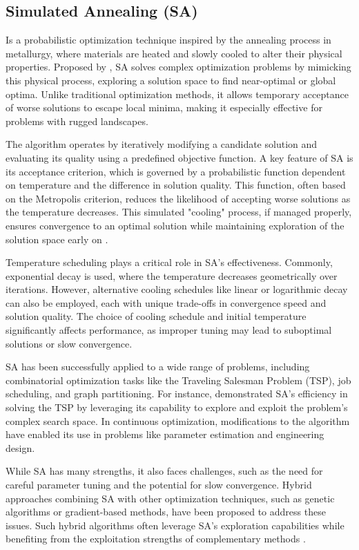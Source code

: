\subsection{Simulated Annealing (SA)}
Is a probabilistic optimization technique inspired by the annealing process in metallurgy, where materials are heated and slowly cooled to alter their physical properties. Proposed by \textcite{kirkpatrick1983optimization}, SA solves complex optimization problems by mimicking this physical process, exploring a solution space to find near-optimal or global optima. Unlike traditional optimization methods, it allows temporary acceptance of worse solutions to escape local minima, making it especially effective for problems with rugged landscapes.

The algorithm operates by iteratively modifying a candidate solution and evaluating its quality using a predefined objective function. A key feature of SA is its acceptance criterion, which is governed by a probabilistic function dependent on temperature and the difference in solution quality. This function, often based on the Metropolis criterion, reduces the likelihood of accepting worse solutions as the temperature decreases. This simulated "cooling" process, if managed properly, ensures convergence to an optimal solution while maintaining exploration of the solution space early on \parencite{aarts1989simulated}.

Temperature scheduling plays a critical role in SA's effectiveness. Commonly, exponential decay is used, where the temperature decreases geometrically over iterations. However, alternative cooling schedules like linear or logarithmic decay can also be employed, each with unique trade-offs in convergence speed and solution quality. The choice of cooling schedule and initial temperature significantly affects performance, as improper tuning may lead to suboptimal solutions or slow convergence.

SA has been successfully applied to a wide range of problems, including combinatorial optimization tasks like the Traveling Salesman Problem (TSP), job scheduling, and graph partitioning. For instance, \textcite{johnson1991optimization} demonstrated SA's efficiency in solving the TSP by leveraging its capability to explore and exploit the problem's complex search space. In continuous optimization, modifications to the algorithm have enabled its use in problems like parameter estimation and engineering design.

While SA has many strengths, it also faces challenges, such as the need for careful parameter tuning and the potential for slow convergence. Hybrid approaches combining SA with other optimization techniques, such as genetic algorithms or gradient-based methods, have been proposed to address these issues. Such hybrid algorithms often leverage SA's exploration capabilities while benefiting from the exploitation strengths of complementary methods \parencite{yang2010engineering}.

